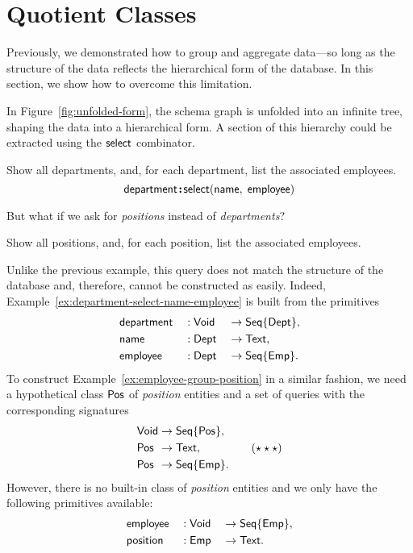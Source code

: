 
\section{Quotient Classes}
\label{sec:quotients}

Previously, we demonstrated how to group and aggregate data---so long as the
structure of the data reflects the hierarchical form of the database.  In this
section, we show how to overcome this limitation.

In Figure~\ref{fig:unfolded-form}, the schema graph is unfolded into an
infinite tree, shaping the data into a hierarchical form.  A section of this
hierarchy could be extracted using the $\mathsf{select}$ combinator.

\begin{demo}
    \label{ex:department-select-name-employee}
    Show all departments, and, for each department, list the associated
    employees.
    \begin{equation*}
        \mathsf{department}\!\boldsymbol{:}\!\mathsf{select}(\mathsf{name},\; \mathsf{employee})
    \end{equation*}
\end{demo}
But what if we ask for \emph{positions} instead of \emph{departments}?

\begin{demo}
    \label{ex:employee-group-position}
    Show all positions, and, for each position, list the associated employees.
\end{demo}

Unlike the previous example, this query does not match the structure of the
database and, therefore, cannot be constructed as easily.  Indeed,
Example~\ref{ex:department-select-name-employee} is built from the primitives
\begin{alignat*}{3}
    & \mathsf{department} && : \mathsf{Void} && \to \mathsf{Seq}{\left\{\mathsf{Dept}\right\}}, \\
    & \mathsf{name} && : \mathsf{Dept} && \to \mathsf{Text}, \\
    & \mathsf{employee} && : \mathsf{Dept} && \to \mathsf{Seq}{\left\{\mathsf{Emp}\right\}}.
\end{alignat*}
To construct Example~\ref{ex:employee-group-position} in a similar fashion, we
need a hypothetical class $\mathsf{Pos}$ of \emph{position} entities and a set of
queries with the corresponding signatures
\begin{equation}
    \label{eq:group-components}
    \begin{alignedat}{2}
        & \mathsf{Void} && \to \mathsf{Seq}{\left\{\mathsf{Pos}\right\}}, \\
        & \mathsf{Pos} && \to \mathsf{Text}, \\
        & \mathsf{Pos} && \to \mathsf{Seq}{\left\{\mathsf{Emp}\right\}}.
    \end{alignedat} \tag{$\star\star\star$}
\end{equation}
However, there is no built-in class of \emph{position} entities and we only
have the following primitives available:
\begin{alignat*}{3}
    & \mathsf{employee} && : \mathsf{Void} && \to \mathsf{Seq}{\left\{\mathsf{Emp}\right\}}, \\
    & \mathsf{position} && : \mathsf{Emp} && \to \mathsf{Text}.
\end{alignat*}

